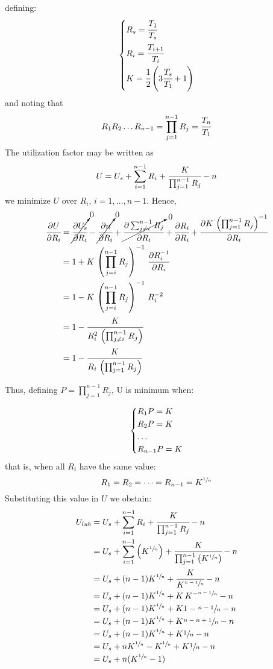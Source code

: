 defining:
\[
    \begin{dcases}
        R_s = \cfrac{T_1}{T_s}\\
        R_i = \cfrac{T_{i+1}}{T_i}\\
        K = \cfrac{1}{2}\left(3\cfrac{T_s}{T_1} + 1\right)
    \end{dcases}
\]
and noting that 
\[R_1R_2\dots R_{n-1} = \prod_{j=1}^{n-1}R_j = \cfrac{T_n}{T_1}\]
The utilization factor may be written as
\[U = U_s + \sum_{i=1}^{n-1}R_i + \cfrac{K}{\prod_{j=1}^{n-1}R_j} - n\]
we minimize $U$ over $R_i$, $i = 1,\dots,n-1$. Hence,
\begin{align*}
    \cfrac{\partial U}{\partial R_i} &= \cancelto{0}{\cfrac{\partial U_s}{\partial R_i}} - \cancelto{0}{\cfrac{\partial n}{\partial R_i}} + \cancelto{0}{\cfrac{\partial\sum_{j\ne i}^{n-1} R_j}{\partial R_i}} + \cfrac{\partial R_i}{\partial R_i} + \cfrac{\partial K\,\left(\prod_{j=1}^{n-1}R_j\right)^{-1}}{\partial R_i}\\
    &= 1 + K\,\left(\prod_{j=i}^{n-1}R_j\right)^{-1}\,\cfrac{\partial R_i^{-1}}{\partial R_i}\\
    &= 1 - K\,\left(\prod_{j=i}^{n-1}R_j\right)^{-1}\,R_i^{-2}\\
    &= 1 - \cfrac{K}{R_i^2\,\left(\prod_{j\ne i}^{n-1}R_j\right)}\\
    &= 1 - \cfrac{K}{R_i \, \left(\prod_{j=1}^{n-1}R_j\right)}
\end{align*}

Thus, defining $P= \prod_{j=1}^{n-1}R_j$, U is minimum when:

\[
\begin{dcases}
    R_1P = K\\
    R_2P = K\\
    \dots\\
    R_{n-1}P = K
\end{dcases}
\]
that is, when all $R_i$ have the same value:
\[R_1 = R_2 = \dots = R_{n-1} = K^{\sfrac{1}{n}}\]
Substituting this value in $U$ we obstain:
\begin{align*}
    U_{lub} &= U_s + \sum_{i=1}^{n-1}R_i + \cfrac{K}{\prod_{j=1}^{n-1}R_j} - n\\
    &= U_s +\sum_{i=1}^{n-1}\left(K^{\sfrac{1}{n}}\right) + \cfrac{K}{\prod_{j=1}^{n-1}\left(K^{\sfrac{1}{n}}\right)} - n\\
    &= U_s + (n-1)K^{\sfrac{1}{n}} + \cfrac{K}{K^{\sfrac{n-1}{n}}}-n\\
    &= U_s + (n-1)K^{\sfrac{1}{n}} + K\,K^{-\sfrac{n-1}{n}}-n\\
    &= U_s + (n-1)K^{\sfrac{1}{n}} + K{1-\sfrac{n-1}{n}}-n\\
    &= U_s + (n-1)K^{\sfrac{1}{n}} + K{\sfrac{n-n+1}{n}}-n\\
    &= U_s + (n-1)K^{\sfrac{1}{n}} + K{\sfrac{1}{n}}-n\\
    &= U_s + nK^{\sfrac{1}{n}} - K^{\sfrac{1}{n}} + K{\sfrac{1}{n}} - n\\
    &= U_s + n(K^{\sfrac{1}{n}} - 1)
\end{align*}

